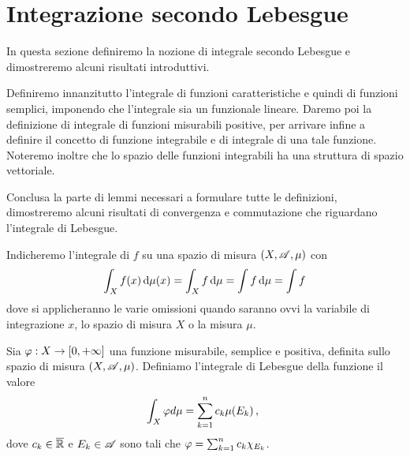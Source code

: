 \section{Integrazione secondo Lebesgue}
In questa sezione definiremo la nozione di integrale secondo Lebesgue e dimostreremo alcuni risultati introduttivi.

Definiremo innanzitutto l'integrale di funzioni caratteristiche e quindi di funzioni semplici, imponendo che l'integrale sia un funzionale lineare. Daremo poi la definizione di integrale di funzioni misurabili positive, per arrivare infine a definire il concetto di funzione integrabile e di integrale di una tale funzione. Noteremo inoltre che lo spazio delle funzioni integrabili ha una struttura di spazio vettoriale.

Conclusa la parte di lemmi necessari a formulare tutte le definizioni, dimostreremo alcuni risultati di convergenza e commutazione che riguardano l'integrale di Lebesgue.

\begin{remark}
	Indicheremo l'integrale di $f$ su una spazio di misura $(X,\mathscr A,\mu)$ con 
	\begin{equation*}
		\int_X f(x) \,\mathrm d \mu(x)=\int_X f \,\mathrm d \mu=\int f \,\mathrm d \mu=\int f
	\end{equation*}
	dove si applicheranno le varie omissioni quando saranno ovvi la variabile di integrazione $x$, lo spazio di misura $X$ o la misura $\mu$.
\end{remark}

\begin{definition}\label{def:IntegraleSemplici}
	Sia $\varphi:X\to [0,+\infty]$ una funzione misurabile, semplice e positiva, definita sullo spazio di misura $(X,\mathscr A,\mu)$. Definiamo l'integrale di Lebesgue della funzione il valore
	\begin{equation*}
		\int_X \varphi d \mu = \sum_{k=1}^n c_k\mu(E_k)\, \text{, }
	\end{equation*}
	dove $c_k\in \overline{\mathbb R}$ e $E_k \in \mathscr A$ sono tali che $\varphi=\sum_{k=1}^nc_k\chi_{E_k}$.
\end{definition}

